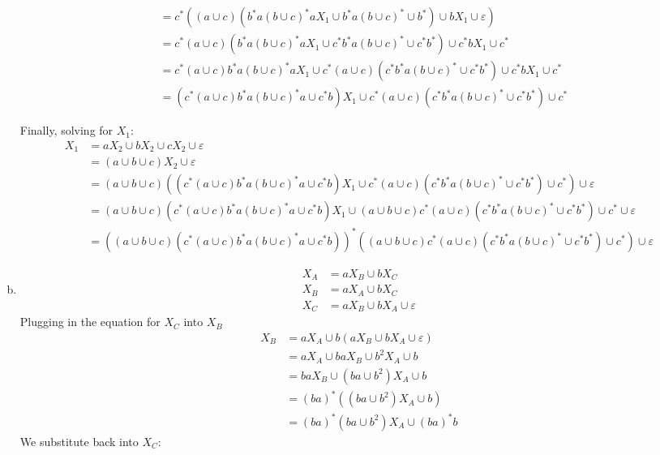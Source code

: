 \begin{solution}
\begin{enumerate}[(a)]
\begin{align*}
            &= c^*((a\cup c)(b^*a{(b\cup c)}^*aX_1\cup b^*a{(b\cup c)}^*\cup b^*)\cup bX_1\cup\varepsilon)\\
            &= c^*(a\cup c)(b^*a{(b\cup c)}^*aX_1\cup c^*b^*a{(b\cup c)}^*\cup c^*b^*)\cup c^*bX_1\cup c^*\\
            &= c^*(a\cup c)b^*a{(b\cup c)}^*aX_1\cup c^*(a\cup c)(c^*b^*a{(b\cup c)}^*\cup c^*b^*)\cup c^*bX_1\cup c^*\\
            &= (c^*(a\cup c)b^*a{(b\cup c)}^*a\cup c^*b)X_1\cup c^*(a\cup c)(c^*b^*a{(b\cup c)}^*\cup c^*b^*)\cup c^*
    \end{align*}

    Finally, solving for \(X_1\):
    \begin{align*}
        X_1 &= aX_2\cup bX_2\cup cX_2\cup\varepsilon \\
            &= (a\cup b\cup c)X_2\cup\varepsilon \\
            &= (a\cup b\cup c)((c^*(a\cup c)b^*a{(b\cup c)}^*a\cup c^*b)X_1\cup c^*(a\cup c)(c^*b^*a{(b\cup c)}^*\cup c^*b^*)\cup c^*)\cup\varepsilon \\
            &= (a\cup b\cup c)(c^*(a\cup c)b^*a{(b\cup c)}^*a\cup c^*b)X_1\cup (a\cup b\cup c)c^*(a\cup c)(c^*b^*a{(b\cup c)}^*\cup c^*b^*)\cup c^*\cup\varepsilon \\
            &= {\left((a\cup b\cup c)(c^*(a\cup c)b^*a{(b\cup c)}^*a\cup c^*b)\right)}^*((a\cup b\cup c)c^*(a\cup c)(c^*b^*a{(b\cup c)}^*\cup c^*b^*)\cup c^*)\cup\varepsilon
    \end{align*}
        \item
    \begin{align*}
        X_A &= aX_B\cup bX_C\\
        X_B &= aX_A\cup bX_C\\
        X_C &= aX_B\cup bX_A\cup\varepsilon
    \end{align*}
    Plugging in the equation for \(X_C\) into \(X_B\)
    \begin{align*}
        X_B &= aX_A\cup b(aX_B\cup bX_A\cup\varepsilon)\\
            &= aX_A\cup baX_B\cup b^2X_A\cup b\\
            &= baX_B\cup (ba\cup b^2)X_A\cup b\\
            &= {(ba)}^*((ba\cup b^2)X_A\cup b)\\
            &= {(ba)}^*(ba\cup b^2)X_A\cup {(ba)}^*b
    \end{align*}
    We substitute back into \(X_C\):
    \begin{align*}

\end{align*}
\end{enumerate}
\end{solution}
